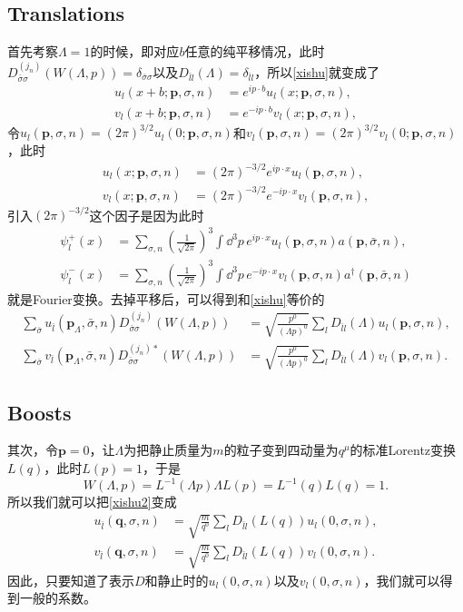 \documentclass[10pt]{extbook}
\theoremstyle{plain}%
\begin{document}
\subsection*{Translations}
首先考察$\Lambda=1$的时候，即对应$b$任意的纯平移情况，此时$D^{(j_n)}_{\bar{\sigma}\sigma}\left(W(\Lambda,p)\right)=\delta_{\bar{\sigma}\sigma}$以及$D_{\bar{l}l}(\Lambda)=\delta_{\bar{l}l}$，所以\eqref{xishu}就变成了
\[
	\begin{split}
		u_{l}(x+b;\mathbf{p},\sigma,n)&=e^{i p\cdot b}u_{l}(x;\mathbf{p},\sigma,n),\\
		v_{l}(x+b;\mathbf{p},\sigma,n)&=e^{-i p\cdot b}v_{l}(x;\mathbf{p},\sigma,n),
	\end{split}
\]
令$u_{l}(\mathbf{p},\sigma,n)=(2\pi)^{3/2}u_{l}(0;\mathbf{p},\sigma,n)$和$v_{l}(\mathbf{p},\sigma,n)=(2\pi)^{3/2}v_{l}(0;\mathbf{p},\sigma,n)$，此时
\[
	\begin{split}
		u_{l}(x;\mathbf{p},\sigma,n)&=(2\pi)^{-3/2}e^{i p\cdot x}u_{l}(\mathbf{p},\sigma,n),\\
		v_{l}(x;\mathbf{p},\sigma,n)&=(2\pi)^{-3/2}e^{-ip\cdot x}v_{l}(\mathbf{p},\sigma,n),
	\end{split}
\]
引入$(2\pi)^{-3/2}$这个因子是因为此时
\[
\begin{split}
	\psi_l^{+}(x)&=\sum_{\sigma,n}\left(\frac{1}{\sqrt{2\pi}}\right)^{3}\int \dd^3 p\, e^{ip\cdot x}u_{l}(\mathbf{p},\sigma,n)a(\mathbf{p},\bar{\sigma},n),\\
	\psi_l^{-}(x)&=\sum_{\sigma,n}\left(\frac{1}{\sqrt{2\pi}}\right)^{3}\int \dd^3 p\, e^{-ip\cdot x}v_{l}(\mathbf{p},\sigma,n)a^\dag(\mathbf{p},\bar{\sigma},n)
\end{split}
\]
就是Fourier变换。去掉平移后，可以得到和\eqref{xishu}等价的
\begin{equation}
	\begin{split}
		\sum_{\bar{\sigma}}u_{\bar{l}}(\mathbf{p}_\Lambda,\bar{\sigma},n)D^{(j_n)}_{\bar{\sigma}\sigma}\left(W(\Lambda,p)\right)&=\sqrt{\frac{p^0}{(\Lambda p)^0}}\sum_{l} D_{\bar{l}l}(\Lambda)u_{l}(\mathbf{p},\sigma,n),\\
		\sum_{\bar{\sigma}}v_{\bar{l}}(\mathbf{p}_\Lambda,\bar{\sigma},n)D^{(j_n)*}_{\bar{\sigma}\sigma}\left(W(\Lambda,p)\right)&=\sqrt{\frac{p^0}{(\Lambda p)^0}}\sum_{l} D_{\bar{l}l}(\Lambda)v_{l}(\mathbf{p},\sigma,n).
	\end{split}
	\label{xishu2}
\end{equation}
\subsection*{Boosts}
其次，令$\mathbf{p}=0$，让$\Lambda$为把静止质量为$m$的粒子变到四动量为$q^\mu$的标准Lorentz变换$L(q)$，此时$L(p)=1$，于是
\[
	W(\Lambda,p)=L^{-1}(\Lambda p)\Lambda L(p)=L^{-1}(q)L(q)=1.
\]
所以我们就可以把\eqref{xishu2}变成
\[
	\begin{split}
		u_{\bar{l}}(\mathbf{q},\sigma,n)&=\sqrt{\frac{m}{q^0}}\sum_{l} D_{\bar{l}l}(L(q))u_{l}(0,\sigma,n),\\
		v_{\bar{l}}(\mathbf{q},\sigma,n)&=\sqrt{\frac{m}{q^0}}\sum_{l} D_{\bar{l}l}(L(q))v_{l}(0,\sigma,n).
	\end{split}
\]
因此，只要知道了表示$D$和静止时的$u_{l}(0,\sigma,n)$以及$v_{l}(0,\sigma,n)$，我们就可以得到一般的系数。
\end{document}
